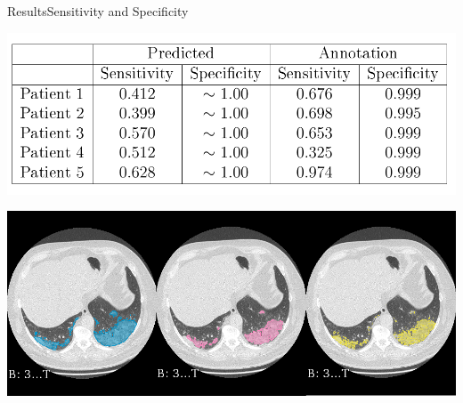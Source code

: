 \documentclass{standalone}
\begin{document}
	\begin{frame}[noframenumbering]{Results}{Sensitivity and Specificity}
		
		\centering\includegraphics[width=.8\linewidth]{./img/Tabella}
		
		\centering\includegraphics[width=.8\linewidth]{./img/GTCOMP1}
		
	\end{frame}
\end{document}
